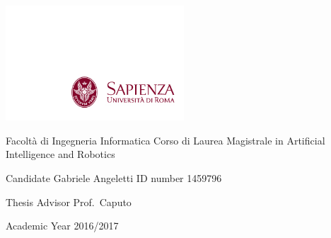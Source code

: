 \documentclass[12pt,a4paper,oneside]{book}
\begin{document}
    \begin{titlepage}
        \raggedright{\includegraphics[width=0.5\textwidth]{./img/logo-sapienza.png}}
        \vspace{1cm}
        \vspace{3cm}
        \raggedright{\color{sapienza} Facoltà di Ingegneria Informatica \newline Corso di Laurea Magistrale in Artificial Intelligence and Robotics \par}
        \vspace{3cm}
        \raggedright{Candidate \newline Gabriele Angeletti \newline ID number 1459796 \par}
        \vspace{1cm}
        \raggedright{Thesis Advisor \newline Prof.\ Caputo \par}
        \vspace{3cm}
        \raggedright{Academic Year 2016/2017 \par}
    \end{titlepage}
    \newpage
    
    \newpage
    

    \begingroup
        \let\cleardoublepage\clearpage
        \tableofcontents
        \listoffigures
        \listoftables
        \let\clearpage
    \endgroup

    
    
    
    
    
    
    
    
    \printbibliography{}
    
\end{document}
